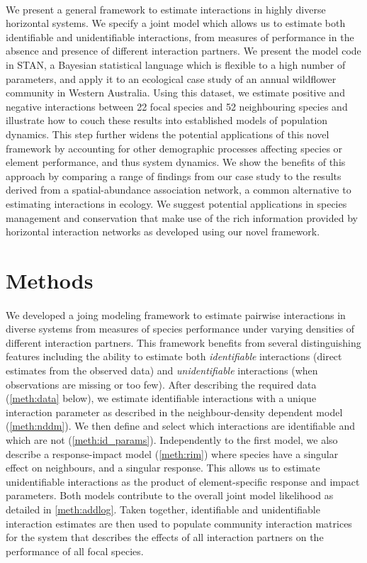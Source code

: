 \documentclass[a4,12pt]{article}
\begin{document}
    \paragraph{} 
    We present a general framework to estimate interactions in highly diverse horizontal systems. We specify a joint model which allows us to estimate both identifiable and unidentifiable interactions, from measures of performance in the absence and presence of different interaction partners. We present the model code in STAN, a Bayesian statistical language which is flexible to a high number of parameters, and apply it to an ecological case study of an annual wildflower community in Western Australia. Using this  dataset, we estimate positive and negative interactions between 22 focal species and 52 neighbouring species and illustrate how to couch these results into established models of population dynamics. This step further widens the potential applications of this novel framework by accounting for other demographic processes affecting species or element performance, and thus system dynamics. We show the benefits of this approach by comparing a range of findings from our case study to the results derived from a spatial-abundance association network, a common alternative to estimating interactions in ecology. We suggest potential applications in species management and conservation that make use of the rich information provided by horizontal interaction networks as developed using our novel framework.


\section{Methods}

\paragraph{} 
We developed a joing modeling framework to estimate pairwise interactions in diverse systems from measures of species performance under varying densities of different interaction partners. This framework benefits from several distinguishing features including the ability to estimate both \textit{identifiable} interactions (direct estimates from the observed data) and \textit{unidentifiable} interactions (when observations are missing or too few). After describing the required data (\ref{meth:data} below), we estimate identifiable interactions with a unique interaction parameter as described in the neighbour-density dependent model (\ref{meth:nddm}).
We then define and select which interactions are identifiable and which are not (\ref{meth:id_params}). Independently to the first model, we also describe a response-impact model (\ref{meth:rim}) where species have a singular effect on neighbours, and a singular response. This allows us to estimate unidentifiable interactions as the product of element-specific response and impact parameters. Both models contribute to the overall joint model likelihood as detailed in \ref{meth:addlog}.
Taken together, identifiable and unidentifiable interaction estimates are then used to populate community interaction matrices for the system that describes the effects of all interaction partners on the performance of all focal species. 
\end{document}
